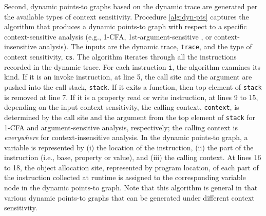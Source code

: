 Second, dynamic points-to graphs based on the dynamic trace are generated per the available types of context sensitivity. Procedure \ref{alg:dyn-pts} captures the algorithm that produces a dynamic points-to graph with respect to a specific context-sensitive analysis (e.g., 1-CFA, 1st-argument-sensitive \cite{DBLP:conf/ecoop/WeiR15}, or context-insensitive analysis). The inputs are the dynamic trace, {\tt trace}, and the type of context sensitivity, {\tt cs}. The algorithm iterates through all the instructions recorded in the dynamic trace. For each instruction {\tt i}, the algorithm examines its kind. If it is an invoke instruction, at line 5, the call site and the argument are pushed into the call stack, {\tt stack}. If it exits a function, then top element of {\tt stack} is removed  at line 7. If it is a property read or write instruction, at lines 9 to 15, depending on the input context sensitivity, the calling context, {\tt context}, is determined by the call site and the argument from the top element of {\tt stack} for 1-CFA and argument-sensitive analysis, respectively; the calling context is {\it everywhere} for context-insensitive analysis. In the dynamic points-to graph, a variable is represented by (i) the location of the instruction, (ii) the part of the instruction (i.e., base, property or value), and (iii) the calling context. At lines 16 to 18, the object allocation site, represented by program location, of each part of the instruction collected at runtime is assigned to the corresponding variable node in the dynamic points-to graph. Note that this algorithm is general in that various dynamic points-to graphs that can be generated under different context sensitivity.

\newcommand{\SWITCH}[1]{\STATE \textbf{switch} (#1) \begin{ALC@g}}
\newcommand{\ENDSWITCH}{\end{ALC@g} \STATE \textbf{end switch}}
\newcommand{\CASE}[1]{\STATE \textbf{case} #1\textbf{:} \begin{ALC@g}}
\newcommand{\ENDCASE}{\end{ALC@g}}
\newcommand{\CASELINE}[1]{\STATE \textbf{case} #1\textbf{:} \begin{ALC@g}}
\newcommand{\DEFAULT}{\STATE \textbf{default:} \begin{ALC@g}}
\newcommand{\ENDDEFAULT}{\end{ALC@g}}
\newcommand{\DEFAULTLINE}[1]{\STATE \textbf{default:} }

